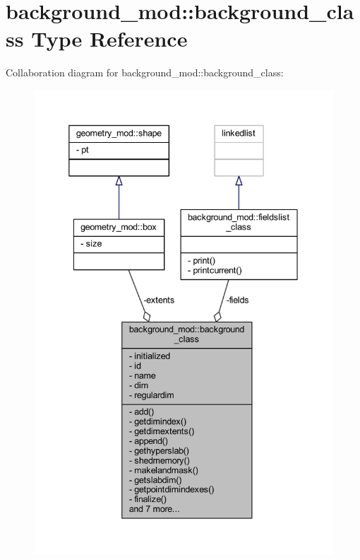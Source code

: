\hypertarget{structbackground__mod_1_1background__class}{}\section{background\+\_\+mod\+:\+:background\+\_\+class Type Reference}
\label{structbackground__mod_1_1background__class}


Collaboration diagram for background\+\_\+mod\+:\+:background\+\_\+class\+:\nopagebreak
\begin{figure}[H]
\begin{center}
\leavevmode
\includegraphics[width=339pt]{structbackground__mod_1_1background__class__coll__graph}
\end{center}
\end{figure}

